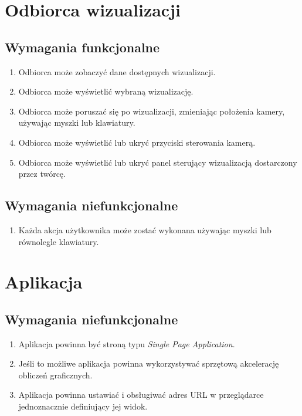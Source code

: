 \section{Odbiorca wizualizacji}

\subsection{Wymagania funkcjonalne}
\begin{enumerate}
    \item Odbiorca może zobaczyć dane dostępnych wizualizacji.
    \item Odbiorca może wyświetlić wybraną wizualizację.
    \item Odbiorca może poruszać się po wizualizacji, zmieniając położenia kamery, używając myszki lub klawiatury.
    \item Odbiorca może wyświetlić lub ukryć przyciski sterowania kamerą.
    \item Odbiorca może wyświetlić lub ukryć panel sterujący wizualizacją dostarczony przez twórcę.
\end{enumerate}
\subsection{Wymagania niefunkcjonalne}
\begin{enumerate}
    \item Każda akcja użytkownika może zostać wykonana używając myszki lub równolegle klawiatury.
\end{enumerate}

\section{Aplikacja}

\subsection{Wymagania niefunkcjonalne}
\begin{enumerate}
    \item Aplikacja powinna być stroną typu \textit{Single Page Application}. %
    \item Jeśli to możliwe aplikacja powinna wykorzystywać sprzętową akcelerację obliczeń graficznych.
    \item Aplikacja powinna ustawiać i obsługiwać adres URL w przeglądarce jednoznacznie definiujący jej widok.
\end{enumerate}
